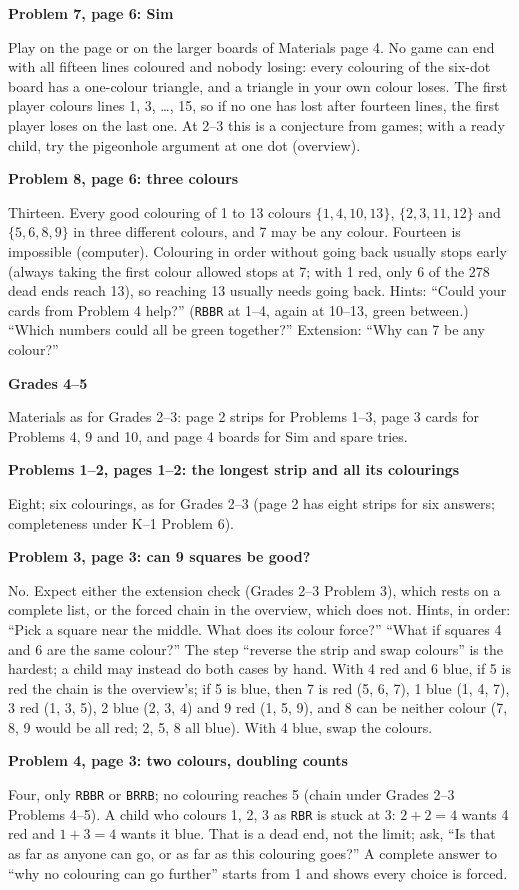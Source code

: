 \documentclass[11pt]{article}
\newcommand{\head}[1]{\par\needspace{8\baselineskip}\medskip\textbf{\large #1}\par}
\newcommand{\sub}[1]{\par\needspace{4\baselineskip}\textbf{#1}\par}
\newcommand{\st}[1]{\texttt{#1}}
\begin{document}
\sub{Problem 7, page 6: Sim}
Play on the page or on the larger boards of Materials page 4. No game can end with all fifteen lines coloured and nobody losing: every colouring of the six-dot board has a one-colour triangle, and a triangle in your own colour loses. The first player colours lines 1, 3, \dots, 15, so if no one has lost after fourteen lines, the first player loses on the last one. At 2--3 this is a conjecture from games; with a ready child, try the pigeonhole argument at one dot (overview).

\sub{Problem 8, page 6: three colours}
Thirteen. Every good colouring of 1 to 13 colours $\{1,4,10,13\}$, $\{2,3,11,12\}$ and $\{5,6,8,9\}$ in three different colours, and 7 may be any colour. Fourteen is impossible (computer). Colouring in order without going back usually stops early (always taking the first colour allowed stops at 7; with 1 red, only 6 of the 278 dead ends reach 13), so reaching 13 usually needs going back. Hints: ``Could your cards from Problem 4 help?'' (\st{RBBR} at 1--4, again at 10--13, green between.) ``Which numbers could all be green together?'' Extension: ``Why can 7 be any colour?''

\head{Grades 4--5}
Materials as for Grades 2--3: page 2 strips for Problems 1--3, page 3 cards for Problems 4, 9 and 10, and page 4 boards for Sim and spare tries.

\sub{Problems 1--2, pages 1--2: the longest strip and all its colourings}
Eight; six colourings, as for Grades 2--3 (page 2 has eight strips for six answers; completeness under K--1 Problem 6).

\sub{Problem 3, page 3: can 9 squares be good?}
No. Expect either the extension check (Grades 2--3 Problem 3), which rests on a complete list, or the forced chain in the overview, which does not. Hints, in order: ``Pick a square near the middle. What does its colour force?'' ``What if squares 4 and 6 are the same colour?'' The step ``reverse the strip and swap colours'' is the hardest; a child may instead do both cases by hand. With 4 red and 6 blue, if 5 is red the chain is the overview's; if 5 is blue, then 7 is red (5, 6, 7), 1 blue (1, 4, 7), 3 red (1, 3, 5), 2 blue (2, 3, 4) and 9 red (1, 5, 9), and 8 can be neither colour (7, 8, 9 would be all red; 2, 5, 8 all blue). With 4 blue, swap the colours.

\sub{Problem 4, page 3: two colours, doubling counts}
Four, only \st{RBBR} or \st{BRRB}; no colouring reaches 5 (chain under Grades 2--3 Problems 4--5). A child who colours 1, 2, 3 as \st{RBR} is stuck at 3: $2+2=4$ wants 4 red and $1+3=4$ wants it blue. That is a dead end, not the limit; ask, ``Is that as far as anyone can go, or as far as this colouring goes?'' A complete answer to ``why no colouring can go further'' starts from 1 and shows every choice is forced.
\end{document}
